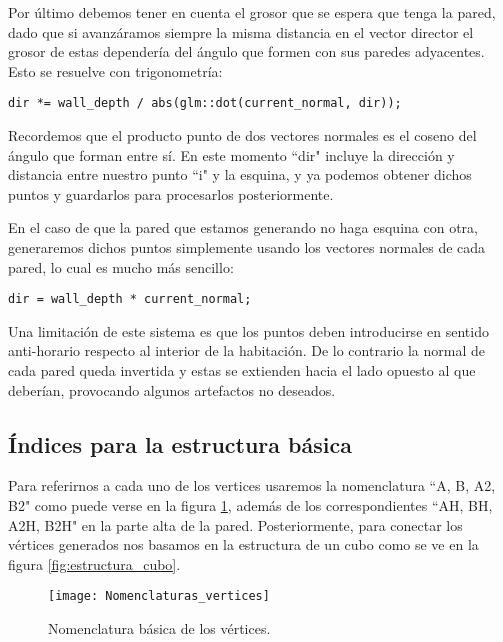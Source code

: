 Por último debemos tener en cuenta el grosor que se espera que tenga la pared, dado que si avanzáramos siempre la misma distancia en el vector director el grosor de estas dependería del ángulo que formen con sus paredes adyacentes. Esto se resuelve con trigonometría:

\begin{lstlisting}
dir *= wall_depth / abs(glm::dot(current_normal, dir));
\end{lstlisting}

Recordemos que el producto punto de dos vectores normales es el coseno del ángulo que forman entre sí. En este momento ``dir" incluye la dirección y distancia entre nuestro punto ``i" y la esquina, y ya podemos obtener dichos puntos y guardarlos para procesarlos posteriormente.

En el caso de que la pared que estamos generando no haga esquina con otra, generaremos dichos puntos simplemente usando los vectores normales de cada pared, lo cual es mucho más sencillo:

\begin{lstlisting}
dir = wall_depth * current_normal;
\end{lstlisting}

Una limitación de este sistema es que los puntos deben introducirse en sentido anti-horario respecto al interior de la habitación. De lo contrario la normal de cada pared queda invertida y estas se extienden hacia el lado opuesto al que deberían, provocando algunos artefactos no deseados.

\subsection{Índices para la estructura básica}
Para referirnos a cada uno de los vertices usaremos la nomenclatura ``A, B, A2, B2" como puede verse en la figura \ref{fig:nomenclatura_vertices}, además de los correspondientes ``AH, BH, A2H, B2H" en la parte alta de la pared. Posteriormente, para conectar los vértices generados nos basamos en la estructura de un cubo como se ve en la figura \ref{fig:estructura_cubo}.

\begin{figure}[H]
    \centering
    \texttt{[image: Nomenclaturas\_vertices]}
    \caption{Nomenclatura básica de los vértices.}
    \label{fig:nomenclatura_vertices}
\end{figure}

